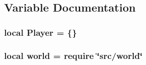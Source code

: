 \subsection{Variable Documentation}
\hypertarget{player_8lua_a4a2733d95600e4c2e800386995afb7b2}{
\subsubsection[{Player}]{\setlength{\rightskip}{0pt plus 5cm}local Player = \{\}}}\label{player_8lua_a4a2733d95600e4c2e800386995afb7b2}
\hypertarget{player_8lua_a054520f514ab0d9a9b0fede5a23db9f7}{
\subsubsection[{world}]{\setlength{\rightskip}{0pt plus 5cm}local world = require \char`\"{}src/world\char`\"{}}}\label{player_8lua_a054520f514ab0d9a9b0fede5a23db9f7}
